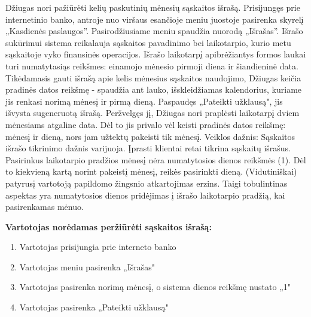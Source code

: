 \documentclass{VUMIFPSkursinis}
\begin{document}
Džiugas nori pažiūrėti kelių paskutinių mėnesių sąskaitos išrašą. Prisijungęs prie internetinio banko, antroje nuo viršaus esančioje meniu juostoje pasirenka skyrelį „Kasdienės paslaugos”. Pasirodžiusiame meniu spaudžia nuorodą „Išrašas”. Išrašo sukūrimui sistema reikalauja sąskaitos pavadinimo bei laikotarpio, kurio metu sąskaitoje vyko finansinės operacijos. Išrašo laikotarpį apibrėžiantys formos laukai turi numatytasiąs reikšmes: einamojo mėnesio pirmoji diena ir šiandieninė data. Tikėdamasis gauti išrašą apie kelis mėnesius sąskaitos naudojimo, Džiugas keičia pradinės datos reikšmę - spaudžia ant lauko, išskleidžiamas kalendorius, kuriame jis renkasi norimą mėnesį ir pirmą dieną. Paspaudęs „Pateikti užklausą", jis išvysta sugeneruotą išrašą. Peržvelgęs jį, Džiugas nori praplėsti laikotarpį dviem mėnesiams atgaline data. Dėl to jis privalo vėl keisti pradinės datos reikšmę: mėnesį ir dieną, nors jam užtektų pakeisti tik mėnesį.
Veiklos dažnis: Sąskaitos išrašo tikrinimo dažnis varijuoja. Įprasti klientai retai tikrina sąskaitų išrašus. 
Pasirinkus laikotarpio pradžios mėnesį nėra numatytosios dienos reikšmės (1). Dėl to kiekvieną kartą norint pakeistį mėnesį, reikės pasirinkti dieną. (Vidutiniškai) patyrusį vartotoją papildomo žingsnio atkartojimas erzins. Taigi tobulintinas aspektas yra numatytosios dienos pridėjimas į išrašo laikotarpio pradžią, kai pasirenkamas mėnuo.
\begin{center}
	\textbf{Vartotojas norėdamas peržiūrėti sąskaitos išrašą:}
\end{center}
\begin{enumerate}
	\item Vartotojas prisijungia prie interneto banko
	\item Vartotojas meniu pasirenka „Išrašas"
	\item Vartotojas pasirenka norimą mėnesį, o sistema dienos reikšmę nustato „1"
	\item Vartotojas pasirenka „Pateikti užklausą"
\end{enumerate}
\end{document}
